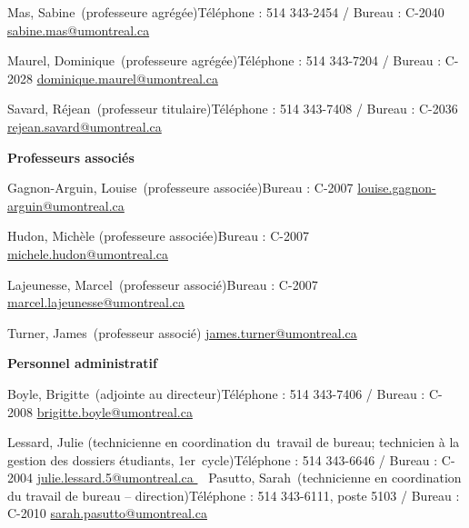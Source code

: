 \documentclass [12 pt]{article}
\begin{document}
            Mas, Sabine (professeure agrégée)Téléphone : 514 343-2454
                / Bureau : C-2040
        \href{
        mailto:sabine.mas@umontreal.ca
        } {
        sabine.mas@umontreal.ca
        }
    
            Maurel, Dominique (professeure agrégée)Téléphone : 514
                343-7204 / Bureau : C-2028
        \href{
        mailto:dominique.maurel@umontreal.ca
        } {
        dominique.maurel@umontreal.ca
        }
    
            Savard, Réjean (professeur titulaire)Téléphone : 514
                343-7408 / Bureau : C-2036
        \href{
        mailto:rejean.savard@umontreal.ca
        } {
        rejean.savard@umontreal.ca
        }
    
            
        \textbf{
        Professeurs
                associés
        }
    
            Gagnon-Arguin, Louise (professeure associée)Bureau :
                    C-2007
        \href{
        mailto:louise.gagnon-arguin@umontreal.ca
        } {
        louise.gagnon-arguin@umontreal.ca
        }
    
            Hudon, Michèle (professeure associée)Bureau : C-2007
        \href{
        mailto:michele.hudon@umontreal.ca
        } {
        michele.hudon@umontreal.ca
        }
    
            Lajeunesse, Marcel (professeur associé)Bureau :
                    C-2007
        \href{
        mailto:marcel.lajeunesse@umontreal.ca
        } {
        marcel.lajeunesse@umontreal.ca
        }
    
            Turner, James (professeur associé)
        \href{
        mailto:james.turner@umontreal.ca
        } {
        james.turner@umontreal.ca
        }
    
            
        \textbf{
        Personnel
                administratif
        }
    
            Boyle, Brigitte (adjointe au directeur)Téléphone : 514
                343-7406 / Bureau : C-2008
        \href{
        mailto:brigitte.boyle@umontreal.ca
        } {
        brigitte.boyle@umontreal.ca
        }
    
            Lessard, Julie (technicienne en coordination du travail de
                bureau; technicien à la gestion des dossiers étudiants,
                1er cycle)Téléphone : 514 343-6646 / Bureau : C-2004
        \href{
        mailto:julie.lessard.5@umontreal.ca
        } {
        julie.lessard.5@umontreal.ca
        }
     
            Pasutto, Sarah (technicienne en coordination du travail de
                bureau – direction)Téléphone : 514 343-6111, poste 5103 / Bureau :
                    C-2010
        \href{
        mailto:sarah.pasutto@umontreal.ca
        } {
        sarah.pasutto@umontreal.ca
        }
    
\end{document}
